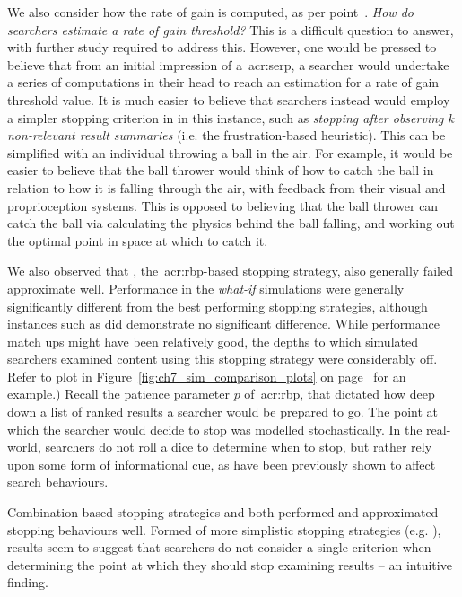 We also consider how the rate of gain is computed, as per point~. \emph{How do searchers estimate a rate of gain threshold?} This is a difficult question to answer, with further study required to address this. However, one would be pressed to believe that from an initial impression of a~\gls{acr:serp}, a searcher would undertake a series of computations in their head to reach an estimation for a rate of gain threshold value. It is much easier to believe that searchers instead would employ a simpler stopping criterion in in this instance, such as \emph{stopping after observing $k$ non-relevant result summaries} (i.e. the frustration-based heuristic). This can be simplified with an individual throwing a ball in the air. For example, it would be easier to believe that the ball thrower would think of how to catch the ball in relation to how it is falling through the air, with feedback from their visual and proprioception systems. This is opposed to believing that the ball thrower can catch the ball via calculating the physics behind the ball falling, and working out the optimal point in space at which to catch it.

We also observed that , the~\gls{acr:rbp}-based stopping strategy, also generally failed approximate well. Performance in the \emph{what-if} simulations were generally significantly different from the best performing stopping strategies, although instances such as  did demonstrate no significant difference. While performance match ups might have been relatively good, the depths to which simulated searchers examined content using this stopping strategy were considerably off. Refer to plot  in Figure~\ref{fig:ch7_sim_comparison_plots} on page~\pageref{fig:ch7_sim_comparison_plots} for an example.) Recall the patience parameter $p$ of~\gls{acr:rbp}, that dictated how deep down a list of ranked results a searcher would be prepared to go. The point at which the searcher would decide to stop was modelled stochastically. In the real-world, searchers do not roll a dice to determine when to stop, but rather rely upon some form of informational cue, as have been previously shown to affect search behaviours.

Combination-based stopping strategies  and  both performed and approximated stopping behaviours well. Formed of more simplistic stopping strategies (e.g. ), results seem to suggest that searchers do not consider a single criterion when determining the point at which they should stop examining results -- an intuitive finding.

